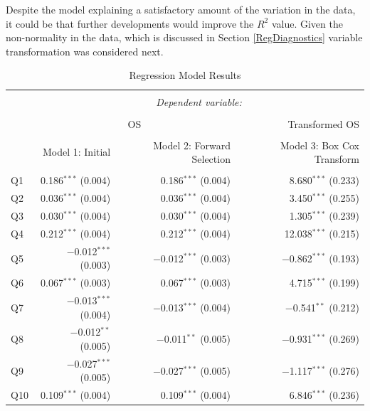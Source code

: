 \documentclass[11pt,a4paper]{report}
\begin{document}
Despite the model explaining a satisfactory amount of the variation in the data, it could be that further developments would improve the $R^2$ value. Given the non-normality in the data, which is discussed in Section \ref{RegDiagnostics} variable transformation was considered next. 

\begin{table}[p] 
		\small
		\centering 
		\caption{Regression Model Results} 
	\label{} 
	\begin{tabular}{@{\extracolsep{5pt}}lrrr} 
		\\[-1.8ex]\hline 
		\hline \\[-1.8ex] 
		& \multicolumn{3}{c}{\textit{Dependent variable:}} \\ 
		\cline{2-4} 
		\\[-1.8ex] & \multicolumn{2}{c}{OS} & Transformed OS \\ 
		\\[-1.8ex] & Model 1: Initial & Model 2: Forward Selection & Model 3: Box Cox Transform\\  
		\hline \\[-1.8ex] 
		Q1 & 0.186$^{***}$ (0.004) & 0.186$^{***}$ (0.004) & 8.680$^{***}$ (0.233)  \\[0.2cm] 
		Q2 & 0.036$^{***}$ (0.004) & 0.036$^{***}$ (0.004) & 3.450$^{***}$ (0.255)  \\[0.2cm] 
		Q3 & 0.030$^{***}$ (0.004) & 0.030$^{***}$ (0.004) & 1.305$^{***}$ (0.239)  \\[0.2cm] 
		Q4 & 0.212$^{***}$ (0.004) & 0.212$^{***}$ (0.004) & 12.038$^{***}$ (0.215)  \\[0.2cm] 
		Q5 & $-$0.012$^{***}$ (0.003) & $-$0.012$^{***}$ (0.003) & $-$0.862$^{***}$ (0.193)  \\[0.2cm] 
		Q6 & 0.067$^{***}$ (0.003) & 0.067$^{***}$ (0.003) & 4.715$^{***}$ (0.199)  \\[0.2cm] 
		Q7 & $-$0.013$^{***}$ (0.004) & $-$0.013$^{***}$ (0.004) & $-$0.541$^{**}$ (0.212)  \\[0.2cm] 
		Q8 & $-$0.012$^{**}$ (0.005) & $-$0.011$^{**}$ (0.005) & $-$0.931$^{***}$ (0.269)  \\[0.2cm] 
		Q9 & $-$0.027$^{***}$ (0.005) & $-$0.027$^{***}$ (0.005) & $-$1.117$^{***}$ (0.276)  \\[0.2cm] 
		Q10 & 0.109$^{***}$ (0.004) & 0.109$^{***}$ (0.004) & 6.846$^{***}$ (0.236)  \\[0.2cm] 

\end{tabular}
\end{table}
\end{document}

